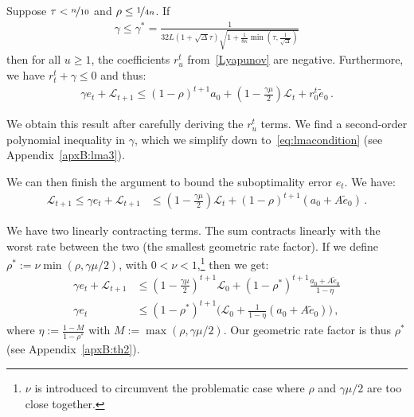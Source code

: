 \documentclass[twoside, 11pt]{article}
\newcommand{\stepsize}{\gamma}
\newcommand{\strongconvex}{\mu}
\newcommand{\overlap}{\tau}
\newcommand{\contraction}{\rho}
\newcommand{\sparsity}{\Delta}
\newcommand{\lipschitz}{L}
\newcommand{\lyapunov}{\mathcal{L}}
\begin{document}
\begin{lemma} \label{lma:3}
	Suppose $\overlap < \nicefrac{n}{10}$ and $\contraction \leq \nicefrac{1}{4n}$. If
	\begin{align}\label{eq:lmacondition}
	\stepsize \leq \stepsize^* = \frac{1}{32\lipschitz (1 + \sqrt{\sparsity} \overlap) \sqrt{1 + \frac{1}{8\kappa} \min(\overlap, \frac{1}{\sqrt{\sparsity}})}}
	\end{align}
	then for all $u \geq 1$, the coefficients $r_u^t$ from~\eqref{Lyapunov} are negative.
	Furthermore, we have $r_t^t + \stepsize \leq 0$ and thus:
	\begin{align}
	\stepsize  e_t + \lyapunov_{t+1} \leq (1 - \contraction)^{t+1}a_0 + (1-\frac{\stepsize\strongconvex}{2})\lyapunov_t + r_0^t \tilde e_0 \,.
	\end{align}

\end{lemma}
We obtain this result after carefully deriving the $r_u^t$ terms.
We find a second-order polynomial inequality in $\stepsize$, which we simplify down to~\eqref{eq:lmacondition} (see Appendix~\ref{apxB:lma3}).

We can then finish the argument to bound the suboptimality error $e_t$. We have:
\begin{align}
\lyapunov_{t+1} \leq
\stepsize e_t + \lyapunov_{t+1}
&\leq (1-\frac{\stepsize\strongconvex}{2})\lyapunov_t  +(1 - \contraction)^{t+1} (a_0 + A \tilde e_0)  \, .
\end{align}

We have two linearly contracting terms.
The sum contracts linearly with the worst rate between the two (the smallest geometric rate factor).
If we define $\contraction^* := \nu \min(\contraction, \stepsize \strongconvex / 2)$, with $0 <\nu < 1$,\footnote{$\nu$ is introduced to circumvent the problematic case where $\contraction$ and  $\stepsize \strongconvex / 2$ are too close together.} then we get:
\begin{align}
\stepsize e_t + \lyapunov_{t+1}
&\leq (1-\frac{\stepsize\strongconvex}{2})^{t+1}\lyapunov_0 + (1 - \contraction^*)^{t+1} \frac{a_0 + A \tilde e_0}{1 -\eta}
\\
\stepsize e_t &\leq (1 - \contraction^*)^{t+1} \big(\lyapunov_0 + \frac{1}{1 -\eta} (a_0 + A  \tilde e_0) \big) \, ,
\end{align}
where $\eta := \frac{1-M}{1-\contraction^*}$ with $M :=\max(\contraction, \stepsize\strongconvex/2)$. Our geometric rate factor is thus $\contraction^*$ (see Appendix~\ref{apxB:th2}).
\end{document}

